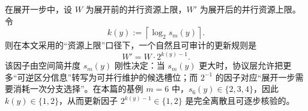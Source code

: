\begin{proposition}[单步资源上限的确定性更新因子]\label{prop:one_step_resource_bound}
在展开一步中，设 \(W\) 为展开前的并行资源上限，\(W'\) 为展开后的并行资源上限。令
$$
k(y):=\left\lceil\log_2 s_m(y)\right\rceil.
$$
则在本文采用的“资源上限”口径下，一个自然且可审计的更新规则是
$$
W' = W\cdot 2^{k(y)-1}.
$$
该因子由空间简并度 \(s_m(y)\) 刚性决定：当 \(s_m(y)\) 更大时，协议层允许把更多“可逆区分信息”转写为可并行维护的候选槽位；而 \(2^{-1}\) 的因子对应“展开一步需要消耗一次分支选择”。在本篇的基例 \(m=6\) 中，\(s_6(y)\in\{2,3,4\}\)，因此 \(k(y)\in\{1,2\}\)，从而更新因子 \(2^{k(y)-1}\in\{1,2\}\) 是完全离散且可逐步核验的。
\end{proposition}

